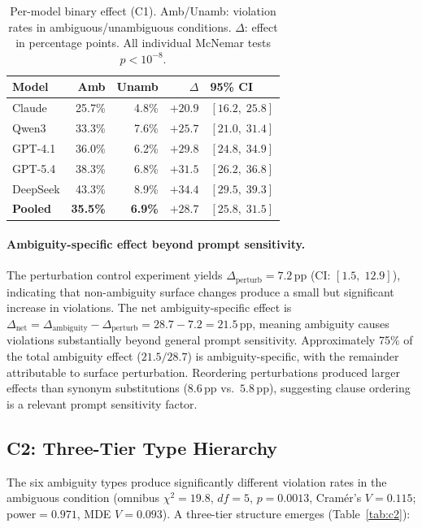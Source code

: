\documentclass[11pt,twocolumn]{article}
\newcommand{\pp}{\,\text{pp}}
\newcommand{\CI}[2]{[#1,\;#2]}
\begin{document}
\begin{table}[t]
\centering
\small
\begin{tabular}{@{}lrrrl@{}}
\toprule
\textbf{Model} & \textbf{Amb} & \textbf{Unamb} & \textbf{$\Delta$} & \textbf{95\% CI} \\
\midrule
Claude & 25.7\% & 4.8\% & $+20.9$ & $\CI{16.2}{25.8}$ \\
Qwen3 & 33.3\% & 7.6\% & $+25.7$ & $\CI{21.0}{31.4}$ \\
GPT-4.1 & 36.0\% & 6.2\% & $+29.8$ & $\CI{24.8}{34.9}$ \\
GPT-5.4 & 38.3\% & 6.8\% & $+31.5$ & $\CI{26.2}{36.8}$ \\
DeepSeek & 43.3\% & 8.9\% & $+34.4$ & $\CI{29.5}{39.3}$ \\
\midrule
\textbf{Pooled} & \textbf{35.5\%} & \textbf{6.9\%} & $\mathbf{+28.7}$ & $\CI{25.8}{31.5}$ \\
\bottomrule
\end{tabular}
\caption{Per-model binary effect (C1). Amb/Unamb: violation rates in ambiguous/unambiguous conditions. $\Delta$: effect in percentage points. All individual McNemar tests $p<10^{-8}$.}
\label{tab:c1}
\end{table}

\paragraph{Ambiguity-specific effect beyond prompt sensitivity.}
The perturbation control experiment yields $\Delta_{\text{perturb}}=7.2\pp$ (CI: $\CI{1.5}{12.9}$), indicating that non-ambiguity surface changes produce a small but significant increase in violations.
The net ambiguity-specific effect is $\Delta_{\text{net}} = \Delta_{\text{ambiguity}} - \Delta_{\text{perturb}} = 28.7 - 7.2 = 21.5\pp$, meaning ambiguity causes violations substantially beyond general prompt sensitivity.
Approximately 75\% of the total ambiguity effect ($21.5/28.7$) is ambiguity-specific, with the remainder attributable to surface perturbation.
Reordering perturbations produced larger effects than synonym substitutions ($8.6\pp$ vs.\ $5.8\pp$), suggesting clause ordering is a relevant prompt sensitivity factor.

\subsection{C2: Three-Tier Type Hierarchy}

The six ambiguity types produce significantly different violation rates in the ambiguous condition (omnibus $\chi^2=19.8$, $df=5$, $p=0.0013$, Cram\'er's $V=0.115$; power$=0.971$, MDE $V=0.093$).
A three-tier structure emerges (Table~\ref{tab:c2}):
\end{document}
